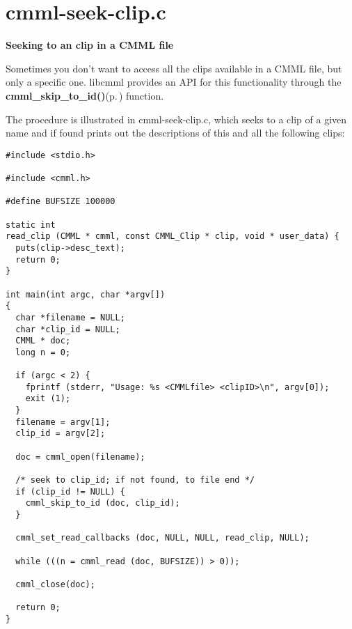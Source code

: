 \section{cmml-seek-clip.c}
{\bf Seeking to an clip in a CMML file}

Sometimes you don't want to access all the clips available in a CMML file, but only a specific one. libcmml provides an API for this functionality through the {\bf cmml\_\-skip\_\-to\_\-id()}{\rm (p.\,\pageref{cmml_8h_a54})} function.

The procedure is illustrated in cmml-seek-clip.c, which seeks to a clip of a given name and if found prints out the descriptions of this and all the following clips: 

\footnotesize\begin{verbatim}
#include <stdio.h>

#include <cmml.h>

#define BUFSIZE 100000

static int
read_clip (CMML * cmml, const CMML_Clip * clip, void * user_data) {
  puts(clip->desc_text);
  return 0;
}

int main(int argc, char *argv[])
{
  char *filename = NULL;
  char *clip_id = NULL;
  CMML * doc;
  long n = 0;

  if (argc < 2) {
    fprintf (stderr, "Usage: %s <CMMLfile> <clipID>\n", argv[0]);
    exit (1);
  }
  filename = argv[1];
  clip_id = argv[2];
  
  doc = cmml_open(filename);
 
  /* seek to clip_id; if not found, to file end */
  if (clip_id != NULL) {
    cmml_skip_to_id (doc, clip_id);
  }

  cmml_set_read_callbacks (doc, NULL, NULL, read_clip, NULL);
 
  while (((n = cmml_read (doc, BUFSIZE)) > 0));
   
  cmml_close(doc);

  return 0;
}
\end{verbatim}
\normalsize
 
